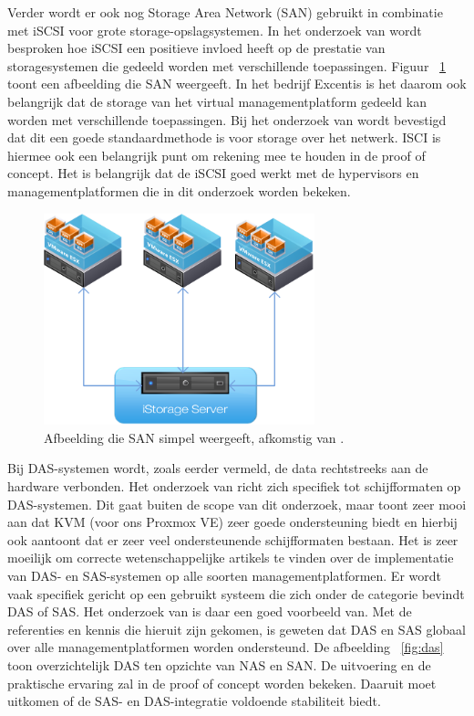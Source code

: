 \FloatBarrier
Verder wordt er ook nog Storage Area Network (SAN) gebruikt in combinatie met iSCSI voor grote storage-opslagsystemen. In het onderzoek van \textcite{park2024performance} wordt besproken hoe iSCSI een positieve invloed heeft op de prestatie van storagesystemen die gedeeld worden met verschillende toepassingen.
Figuur ~\ref{fig:san} toont een afbeelding die SAN weergeeft.
In het bedrijf Excentis is het daarom ook belangrijk dat de storage van het virtual managementplatform gedeeld kan worden met verschillende toepassingen. Bij het onderzoek van \textcite{park2024performance} wordt bevestigd dat dit een goede standaardmethode is voor storage over het netwerk.
ISCI is hiermee ook een belangrijk punt om rekening mee te houden in de proof of concept. Het is belangrijk dat de iSCSI goed werkt met de hypervisors en managementplatformen die in dit onderzoek worden bekeken.

\begin{figure}[h!]
  \centering
  \includegraphics[width=0.7\textwidth]{../onderzoek/nas-isci.png} 
  \caption{Afbeelding die SAN simpel weergeeft, afkomstig van \textcite{kernsafeVMware}.}
  \label{fig:san}
\end{figure}


\FloatBarrier
Bij DAS-systemen wordt, zoals eerder vermeld, de data rechtstreeks aan de hardware verbonden. Het onderzoek van \textcite{joshi2014empirical} richt zich specifiek tot schijfformaten op DAS-systemen.
Dit gaat buiten de scope van dit onderzoek, maar toont zeer mooi aan dat KVM (voor ons Proxmox VE) zeer goede ondersteuning biedt en hierbij ook aantoont dat er zeer veel ondersteunende schijfformaten bestaan.
Het is zeer moeilijk om correcte wetenschappelijke artikels te vinden over de implementatie van DAS- en SAS-systemen op alle soorten managementplatformen.
Er wordt vaak specifiek gericht op een gebruikt systeem die zich onder de categorie bevindt DAS of SAS. Het onderzoek van \textcite{joshi2014empirical} is daar een goed voorbeeld van.
Met de referenties en kennis die hieruit zijn gekomen, is geweten dat DAS en SAS globaal over alle managementplatformen worden ondersteund. De afbeelding ~\ref{fig:das} toon overzichtelijk DAS ten opzichte van NAS en SAN.
De uitvoering en de praktische ervaring zal in de proof of concept worden bekeken. Daaruit moet uitkomen of de SAS- en DAS-integratie voldoende stabiliteit biedt.

